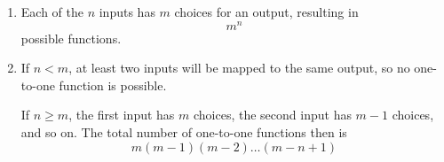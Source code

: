 \begin{enumerate}[label=(\alph*)]
\item   Each of the $n$ inputs has $m$ choices for an output, resulting in $$m^{n}$$ possible functions.

\item   If $n < m$, at least two inputs will be mapped to the same output, so no one-to-one function is possible. 
  
  If $n \geq m$, the first input has $m$ choices, the second input has $m - 1$ choices, and so on. The total number of one-to-one functions then is $$m(m-1)(m-2)\dots(m-n+1)$$
\end{enumerate}